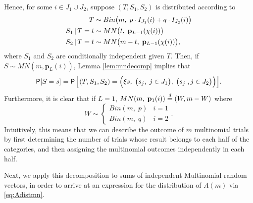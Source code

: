 \documentclass[11pt,draft]{article}
\newcommand{\pv}{\mathbf{p}}
\begin{document}
Hence, for some $i\in J_1 \cup J_2$, suppose $(T, S_1, S_2)$ is distributed
according to
\begin{align}
T &\sim Bin\big(m,\; p \cdot I_{J_1}(i) + q \cdot I_{J_2}(i)\big)\nonumber\\
S_1 \given T = t &\sim MN\big(t,\; \pv_{L-1}(\chi(i))\big) \label{eq:mndecomp}\\
S_2 \given T = t &\sim MN\big(m - t,\; \pv_{L-1}(\chi(i))\big), \nonumber
\end{align}
where $S_1$ and $S_2$ are conditionally independent given $T$.
Then, if $S \sim MN(m, \pv_L(i))$,
Lemma \ref{lem:mndecomp} implies that
\[ \P[S = s] = \P\Big[(T, S_1, S_2) = \Big(\xi s,\;
\big(s_j,\; j\in J_1\big),\; \big(s_j\;, j\in J_2\big)\Big)\Big]. \]
Furthermore, it is clear that if $L=1$,
$MN(m,\; \pv_1(i)) \eqdist (W, m - W)$ where
\[ W \sim \begin{cases} Bin(m,\; p) & i = 1 \\ Bin(m,\; q) & i = 2 \end{cases}.
\]
Intuitively, this means that we can describe the outcome of $m$ multinomial
trials by first determining the number of trials whose result belongs to each
half of the categories, and then assigning the multinomial outcomes
independently in each half.

Next, we apply this decomposition to sums of independent Multinomial random
vectors, in order to arrive at an expression for the distribution of $A(m)$
via \eqref{eq:Adistmn}.
\end{document}
